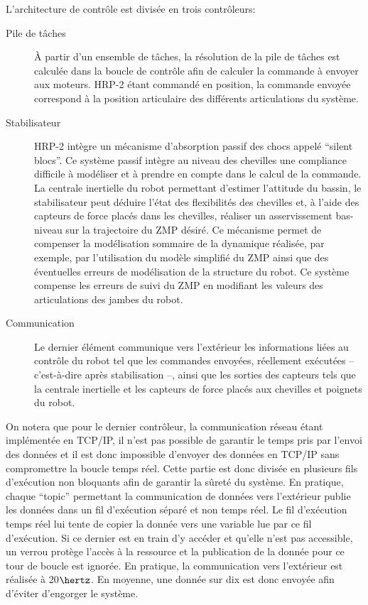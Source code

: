 L'architecture de contrôle est divisée en trois contrôleurs:
\begin{description}
\item[Pile de tâches] À partir d'un ensemble de
  tâches, la résolution de la pile de tâches est calculée dans la
  boucle de contrôle afin de calculer la commande à envoyer aux
  moteurs. HRP-2 étant commandé en position, la commande envoyée
  correspond à la position articulaire des différents articulations du
  système.
\item[Stabilisateur] HRP-2 intègre un mécanisme
  d'absorption passif des chocs appelé ``silent blocs''. Ce système passif intègre au niveau des chevilles une
  compliance difficile à modéliser et à prendre en compte dans le
  calcul de la commande. La centrale inertielle du robot permettant
  d'estimer l'attitude du bassin, le stabilisateur peut déduire
  l'état des flexibilités des chevilles et, à l'aide des capteurs de
  force placés dans les chevilles, réaliser un asservissement
  bas-niveau sur la trajectoire du ZMP
  désiré. Ce mécanisme permet de compenser la modélisation sommaire de
  la dynamique réalisée, par exemple, par l'utilisation du modèle
  simplifié du ZMP ainsi que des éventuelles erreurs de modélisation
  de la structure du robot. Ce système compense les erreurs de suivi
  du ZMP en modifiant les valeurs des articulations des jambes du
  robot.
\item[Communication] Le dernier élément communique vers l'extérieur
  les informations liées au contrôle du robot tel que les commandes
  envoyées, réellement exécutées -- c'est-à-dire après stabilisation
  --, ainsi que les sorties des capteurs tels que la centrale
  inertielle et les capteurs de force placés aux chevilles et poignets
  du robot.
\end{description}


On notera que pour le dernier contrôleur, la communication réseau
étant implémentée en TCP/IP, il n'est pas possible de
garantir le temps pris par l'envoi des données et il est donc
impossible d'envoyer des données en TCP/IP sans
compromettre la boucle temps réel. Cette partie est donc divisée en
plusieurs fils d'exécution non bloquants afin de garantir la sûreté du
système. En pratique, chaque ``topic'' permettant la communication de
données vers l'extérieur publie les données dans un fil d'exécution
séparé et non temps réel. Le fil d'exécution
temps réel lui tente de copier la donnée vers une variable lue par ce
fil d'exécution. Si ce dernier est en train d'y accéder et qu'elle
n'est pas accessible, un verrou protège l'accès à la ressource et la
publication de la donnée pour ce tour de boucle est ignorée. En
pratique, la communication vers l'extérieur est réalisée à 20$\hertz$. En
moyenne, une donnée sur dix est donc envoyée afin d'éviter d'engorger
le système.


